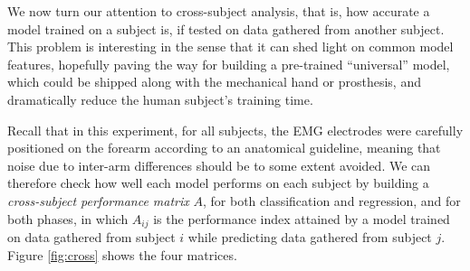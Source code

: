 We now turn our attention to cross-subject analysis, that is, how
accurate a model trained on a subject is, if tested on data gathered
from another subject. This problem is interesting in the sense that it
can shed light on common model features, hopefully paving the way for
building a pre-trained ``universal'' model, which could be shipped
along with the mechanical hand or prosthesis, and dramatically reduce
the human subject's training time.

Recall that in this experiment, for all subjects, the EMG electrodes
were carefully positioned on the forearm according to an anatomical
guideline, meaning that noise due to inter-arm differences should be
to some extent avoided. We can therefore check how well each model
performs on each subject by building a \emph{cross-subject performance
matrix} $A$, for both classification and regression, and for both phases,
in which $A_{ij}$ is the performance index attained by a model trained
on data gathered from subject $i$ while predicting data gathered from
subject $j$. Figure \ref{fig:cross} shows the four matrices.

